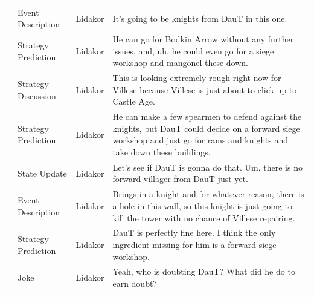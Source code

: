{\begin{longtable}{@{}>{\theAppRow}r|L{2.3cm}L{1.0cm}U{11.55cm}@{}}
    & Event Description     & Lidakor & It's going to be knights from DauT in this one.                                                                                                                                                                                                                                                 \\
    & Strategy Prediction   & Lidakor & He can go for Bodkin Arrow without any further issues, and, uh, he could even go for a siege workshop and mangonel these down.                                                                                                                                                                  \\
    & Strategy Discussion   & Lidakor & This is looking extremely rough right now for Villese because Villese is just about to click up to Castle Age.                                                                                                                                                                                  \\
    & Strategy Prediction   & Lidakor & He can make a few spearmen to defend against the knights, but DauT could decide on a forward siege workshop and just go for rams and knights and take down these buildings.                                                                                                                     \\
    & State Update          & Lidakor & Let's see if DauT is gonna do that. Um, there is no forward villager from DauT just yet.                                                                                                                                                                                                        \\
    & Event Description     & Lidakor & Brings in a knight and for whatever reason, there is a hole in this wall, so this knight is just going to kill the tower with no chance of Villese repairing.                                                                                                                                   \\
    & Strategy Prediction   & Lidakor & DauT is perfectly fine here. I think the only ingredient missing for him is a forward siege workshop.                                                                                                                                                                                           \\
    & Joke                  & Lidakor & Yeah, who is doubting DauT? What did he do to earn doubt?                                                                                                                                                                                                                                       \\

\end{longtable}}
